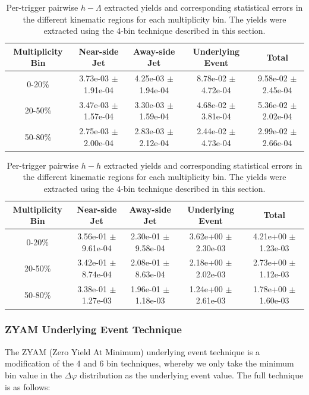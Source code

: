 \documentclass[ALICE,manyauthors]{ALICE_analysis_notes}
\begin{document}
\begin{table}[h!]
\centering
\begin{tabular}{| c | c | c | c | c | }
\hline
Multiplicity Bin & Near-side Jet & Away-side Jet & Underlying Event & Total  \\
\hline
	
0-20\% & 3.73e-03 $\pm$ 1.91e-04 & 4.25e-03 $\pm$ 1.94e-04 & 8.78e-02 $\pm$ 4.72e-04 & 9.58e-02 $\pm$ 2.45e-04 \\
20-50\% & 3.47e-03 $\pm$ 1.57e-04 & 3.30e-03 $\pm$ 1.59e-04 & 4.68e-02 $\pm$ 3.81e-04 & 5.36e-02 $\pm$ 2.02e-04 \\
50-80\% & 2.75e-03 $\pm$ 2.00e-04 & 2.83e-03 $\pm$ 2.12e-04 & 2.44e-02 $\pm$ 4.73e-04 & 2.99e-02 $\pm$ 2.66e-04 \\
	
\hline
\end{tabular}
\caption{Per-trigger pairwise $h-\Lambda$ extracted yields and corresponding statistical errors in the different kinematic regions for each multiplicity bin. The yields were extracted using the 4-bin technique described in this section.}
\label{h_lambda_yield_table_4bin}
\end{table}
	
\begin{table}[h!]
\centering
\begin{tabular}{| c | c | c | c | c | }
\hline
Multiplicity Bin & Near-side Jet & Away-side Jet & Underlying Event & Total  \\
\hline

0-20\% & 3.56e-01 $\pm$ 9.61e-04 & 2.30e-01 $\pm$ 9.58e-04 & 3.62e+00 $\pm$ 2.30e-03 & 4.21e+00 $\pm$ 1.23e-03 \\
20-50\% & 3.42e-01 $\pm$ 8.74e-04 & 2.08e-01 $\pm$ 8.63e-04 & 2.18e+00 $\pm$ 2.02e-03 & 2.73e+00 $\pm$ 1.12e-03 \\
50-80\% & 3.38e-01 $\pm$ 1.27e-03 & 1.96e-01 $\pm$ 1.18e-03 & 1.24e+00 $\pm$ 2.61e-03 & 1.78e+00 $\pm$ 1.60e-03 \\

\hline
\end{tabular}
\caption{Per-trigger pairwise $h-h$ extracted yields and corresponding statistical errors in the different kinematic regions for each multiplicity bin. The yields were extracted using the 4-bin technique described in this section.}
\label{h_h_yield_table_4bin}
\end{table}

\subsubsection{ZYAM Underlying Event Technique}
\label{zyam}
The ZYAM (Zero Yield At Minimum) underlying event technique is a modification of the 4 and 6 bin techniques, whereby we only take the minimum bin value in the $\Delta\varphi$ distribution as the underlying event value. The full technique is as follows:
\end{document}
